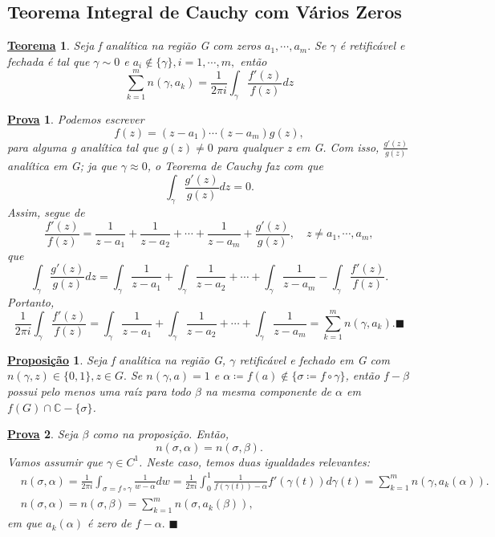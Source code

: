 \documentclass{article}
\newtheorem*{theorem*}{\underline{Teorema}}
\newtheorem*{proof*}{\underline{Prova}}
\newtheorem*{prop*}{\underline{Proposi\c c\~ao}}
\renewcommand\qedsymbol{$\blacksquare$}
\begin{document}
  \subsection{Teorema Integral de Cauchy com V\'arios Zeros}
  \hypertarget{zeros_cauchy}{\begin{theorem*}
      Seja f anal\'itica na regi\~ao G com zeros $a_{1}, \cdots, a_{m}.$ Se $\gamma$ \'e retific\'avel e fechada \'e tal que $\gamma\sim0$
      e $a_{i}\not\in \{\gamma\}, i = 1, \cdots, m, $ ent\~ao
      $$
      \sum\limits_{k=1}^{m}n(\gamma, a_{k}) = \frac{1}{2\pi i}\int_{\gamma}^{}\frac{f'(z)}{f(z)}dz
      $$
  \end{theorem*}}
  \begin{proof*}
    Podemos escrever 
    $$
    f(z) = (z-a_{1})\cdots(z-a_{m})g(z),
    $$
    para alguma g anal\'itica tal que $g(z)\neq0$ para qualquer z em G. Com isso, $\displaystyle \frac{g'(z)}{g(z)}$ anal\'itica em G;
    ja que $\gamma\approx0$, o Teorema de Cauchy faz com que 
    $$
    \int_{\gamma}^{}\frac{g'(z)}{g(z)}dz = 0.
    $$
    Assim, segue de 
    $$
    \frac{f'(z)}{f(z)} = \frac{1}{z-a_{1}} + \frac{1}{z-a_{2}} + \cdots + \frac{1}{z-a_{m}} + \frac{g'(z)}{g(z)},\quad z\neq a_{1}, \cdots, a_{m},
    $$
    que 
    $$
    \int_{\gamma}^{}\frac{g'(z)}{g(z)}dz = \int_{\gamma}^{}\frac{1}{z-a_{1}} + \int_{\gamma}^{}\frac{1}{z-a_{2}} + \cdots + \int_{\gamma}^{}\frac{1}{z-a_{m}} - \int_{\gamma}^{}\frac{f'(z)}{f(z)}.
    $$
    Portanto, 
    $$
    \frac{1}{2\pi i}\int_{\gamma}^{}\frac{f'(z)}{f(z)} = \int_{\gamma}^{}\frac{1}{z-a_{1}} + \int_{\gamma}^{}\frac{1}{z-a_{2}} + \cdots + \int_{\gamma}^{}\frac{1}{z-a_{m}} = \sum\limits_{k=1}^{m}n(\gamma, a_{k}).\text{\qedsymbol}
    $$
  \end{proof*}
  \begin{prop*}
    Seja f anal\'itica na regi\~ao G, $\gamma$ retific\'avel e fechado em G com $n(\gamma, z)\in \{0, 1\}, z\in{G}.$ Se $n(\gamma, a) = 1$
    e $\alpha\coloneqq  f(a)\not\in \{\sigma\coloneqq  f\circ{\gamma}\} $, ent\~ao $f-\beta$ possui pelo menos uma ra\'iz para todo $\beta$ na mesma componente
    de $\alpha$ em $f(G)\cap{\mathbb{C}-\{\sigma\}}$.
  \end{prop*}
  \begin{proof*}
    Seja $\beta$ como na proposi\c c\~ao. Ent\~ao,
    $$
    n(\sigma, \alpha) = n(\sigma, \beta).
    $$
    Vamos assumir que $\gamma\in{C^{1}}$. Neste caso, temos duas igualdades relevantes:
    \begin{align*}
  &n(\sigma, \alpha) = \frac{1}{2\pi i}\int_{\sigma=f\circ{\gamma}}^{}\frac{1}{w-\alpha}dw = \frac{1}{2\pi i}\int_{0}^{1}\frac{1}{f(\gamma(t))-\alpha}f'(\gamma(t))d\gamma(t) = \sum\limits_{k=1}^{m}n(\gamma, a_{k}(\alpha)). \\
  &n(\sigma, \alpha) = n(\sigma, \beta) = \sum\limits_{k=1}^{m}n(\sigma, a_{k}(\beta)),
    \end{align*}
    em que $a_{k}(\alpha)$ \'e zero de $f-\alpha.$ \qedsymbol
  \end{proof*}
\end{document}
